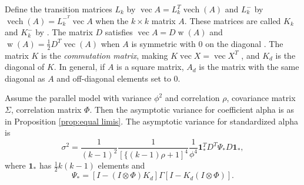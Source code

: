 \documentclass[twoside]{article}
\DeclareMathOperator{\vvec}{vec}
\DeclareMathOperator{\vech}{vech}
\DeclareMathOperator{\w}{w}
\begin{document}
Define the transition matrices $L_{k}$ by $\vvec A=L_{k}^{T}\vech(A)$
and $L_{k}^{-}$ by $\vech(A)=L_{k}^{-^{T}}\vvec A$ when the $k\times k$
matrix $A$. These matrices
are called $K_{k}$ and $K_{k}^{-}$ by \citet{Van_Zyl2000-si}. The
matrix $D$ satisfies $\vvec A=D\w(A)$ and $\w(A)=\frac{1}{2}D^{T}\vvec(A)$
when $A$ is symmetric with $0$ on the diagonal \citep{Neudecker1996-fu}.
The matrix $K$ is the \emph{commutation matrix}, making $K\vvec X=\vvec X^{T}$
\citep[see][Chapter 3.8]{Magnus2019-cz}, and $K_{d}$ is the diagonal
of $K$. In general, if $A$ is a square matrix, $A_{d}$ is the matrix
with the same diagonal as $A$ and off-diagonal elements set to $0$. 
\begin{lem}
\label{lem:variances}Assume the parallel model with variance $\phi^{2}$
and correlation $\rho$, covariance matrix $\Sigma$, correlation
matrix $\Phi$. Then the asymptotic variance for coefficient alpha is as in Proposition \ref{prop:equal limis}. The asymptotic variance for standardized alpha is 
\begin{equation}
\nonumber
\sigma^{2}=\frac{1}{(k-1)^{2}}\frac{1}{[\{(k-1)\rho+1]^{4}}\frac{1}{\phi^{4}}\boldsymbol{1}_{*}^{T}D^{T}\Psi_{*}D\boldsymbol{1}_{*},
\end{equation}
where $\boldsymbol{1}_{*}$ has $\frac{1}{2}k(k-1)$ elements and
\[
\Psi_{*}=[I-(I\otimes\Phi)K_{d}]\Gamma[I-K_{d}(I\otimes\Phi)].
\]
\end{lem}
\end{document}
